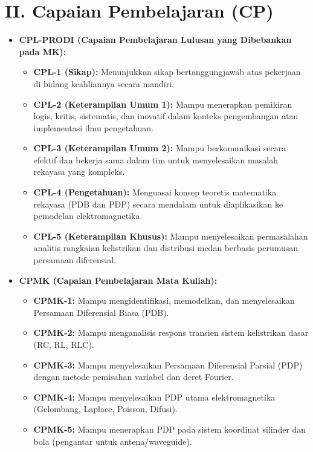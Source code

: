 \documentclass[11pt,a4paper]{article}
\begin{document}
\section*{II. Capaian Pembelajaran (CP)}

\begin{itemize}[leftmargin=*, label=$\bullet$]
    \item \textbf{CPL-PRODI (Capaian Pembelajaran Lulusan yang Dibebankan pada MK):}
    \begin{itemize}[leftmargin=*, label=$\circ$]
        \item \textbf{CPL-1 (Sikap):} Menunjukkan sikap bertanggungjawab atas pekerjaan di bidang keahliannya secara mandiri.
        \item \textbf{CPL-2 (Keterampilan Umum 1):} Mampu menerapkan pemikiran logis, kritis, sistematis, dan inovatif dalam konteks pengembangan atau implementasi ilmu pengetahuan.
        \item \textbf{CPL-3 (Keterampilan Umum 2):} Mampu berkomunikasi secara efektif dan bekerja sama dalam tim untuk menyelesaikan masalah rekayasa yang kompleks.
        \item \textbf{CPL-4 (Pengetahuan):} Menguasai konsep teoretis matematika rekayasa (PDB dan PDP) secara mendalam untuk diaplikasikan ke pemodelan elektromagnetika.
        \item \textbf{CPL-5 (Keterampilan Khusus):} Mampu menyelesaikan permasalahan analitis rangkaian kelistrikan dan distribusi medan berbasis perumusan persamaan diferensial.
    \end{itemize}
    \vspace{0.2cm}

    \item \textbf{CPMK (Capaian Pembelajaran Mata Kuliah):}
    \begin{itemize}[leftmargin=*, label=$\circ$]
        \item \textbf{CPMK-1:} Mampu mengidentifikasi, memodelkan, dan menyelesaikan Persamaan Diferensial Biasa (PDB).
        \item \textbf{CPMK-2:} Mampu menganalisis respons transien sistem kelistrikan dasar (RC, RL, RLC).
        \item \textbf{CPMK-3:} Mampu menyelesaikan Persamaan Diferensial Parsial (PDP) dengan metode pemisahan variabel dan deret Fourier.
        \item \textbf{CPMK-4:} Mampu menyelesaikan PDP utama elektromagnetika (Gelombang, Laplace, Poisson, Difusi).
        \item \textbf{CPMK-5:} Mampu menerapkan PDP pada sistem koordinat silinder dan bola (pengantar untuk antena/waveguide).
    \end{itemize}
    \vspace{0.2cm}


\end{itemize}
\end{document}
